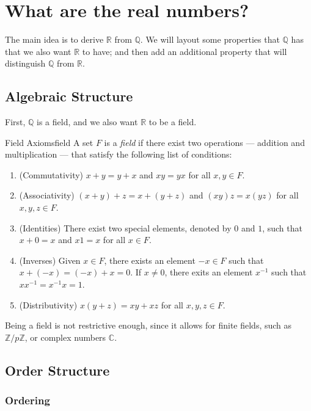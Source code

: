 \chapter{What are the real numbers?}

The main idea is to derive \(\mathbb{R}\) from \(\mathbb{Q}\). We will layout some properties that \(\mathbb{Q}\) has that we also want \(\mathbb{R}\) to have; and then add an additional property that will distinguish \(\mathbb{Q}\) from \(\mathbb{R}\).

\section{Algebraic Structure}

First, \(\mathbb{Q}\) is a field, and we also want \(\mathbb{R}\) to be a field.

\begin{defn}{Field Axioms}{field}
	A set \(F\) is a \emph{field} if there exist two operations --- addition and multiplication --- that satisfy the following list of conditions:
	\begin{enumerate}
		\item (Commutativity) \(x + y = y + x\) and \(xy = yx\) for all \(x, y \in F\).
		\item (Associativity) \((x+y)+z = x+(y+z)\) and \((xy)z=x(yz)\) for all \(x, y, z \in F\).
		\item (Identities) There exist two special elements, denoted by \(0\) and \(1\), such that \(x + 0 = x\) and \(x1 = x\) for all \(x \in F\).
		\item (Inverses) Given \(x \in F\), there exists an element \(-x \in F\) such that \(x + (-x) = (-x) + x = 0\). If \(x \neq 0\), there exits an element \(x^{-1}\) such that \(xx^{-1} = x^{-1}x = 1\).
		\item (Distributivity) \(x(y+z) = xy + xz\) for all \(x, y, z \in F\).
	\end{enumerate}
\end{defn}

Being a field is not restrictive enough, since it allows for finite fields, such as \(\mathbb{Z}/p\mathbb{Z}\), or complex numbers \(\mathbb{C}\).

\section{Order Structure}

\subsection{Ordering}

